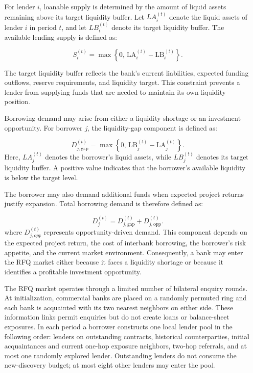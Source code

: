For lender \(i\), loanable supply is determined by the amount of liquid
assets remaining above its target liquidity buffer. Let
\(LA_{i}^{(t)}\) denote the liquid assets of lender \(i\) in period
\(t\), and let \(LB_{i}^{(t)}\) denote its target liquidity buffer. The
available lending supply is defined as:


\begin{equation}
S_i^{(t)}=\max\left\{0,\,\mathrm{LA}_i^{(t)}-\mathrm{LB}_i^{(t)}\right\}\label{eq:rfq-supply}.
\end{equation}


The target liquidity buffer reflects the bank's current liabilities,
expected funding outflows, reserve requirements, and liquidity target.
This constraint prevents a lender from supplying funds that are needed
to maintain its own liquidity position.

Borrowing demand may arise from either a liquidity shortage or an
investment opportunity. For borrower \(j\), the liquidity-gap component
is defined as:


\begin{equation}
D_{j,\mathrm{gap}}^{(t)}=\max\left\{0,\,\mathrm{LB}_j^{(t)}-\mathrm{LA}_j^{(t)}\right\}\label{eq:rfq-gap-demand}.
\end{equation}
\vspace{-0.4\baselineskip}
\noindent Here, \(LA_{j}^{(t)}\) denotes the borrower's liquid assets, while
\(LB_{j}^{(t)}\) denotes its target liquidity buffer. A positive value
indicates that the borrower's available liquidity is below the target
level.

The borrower may also demand additional funds when expected project
returns justify expansion. Total borrowing demand is therefore defined
as:


\begin{equation}
D_j^{(t)}=D_{j,\mathrm{gap}}^{(t)}+D_{j,\mathrm{opp}}^{(t)}\label{eq:rfq-total-demand}.
\end{equation}
\vspace{-0.4\baselineskip}
\noindent where \(D_{j,opp}^{(t)}\) represents opportunity-driven demand. This
component depends on the expected project return, the cost of interbank
borrowing, the borrower's risk appetite, and the current market
environment. Consequently, a bank may enter the RFQ market either
because it faces a liquidity shortage or because it identifies a
profitable investment opportunity.

The RFQ market operates through a limited number of bilateral enquiry
rounds. At initialization, commercial banks are placed on a randomly
permuted ring and each bank is acquainted with its two nearest neighbors
on either side. These information links permit enquiries but do not create
loans or balance-sheet exposures. In each period a borrower constructs one
local lender pool in the following order: lenders on outstanding contracts,
historical counterparties, initial acquaintances and current one-hop
exposure neighbors, two-hop referrals, and at most one randomly explored
lender. Outstanding lenders do not consume the new-discovery budget; at
most eight other lenders may enter the pool.

